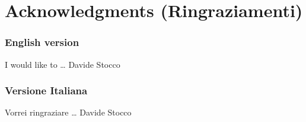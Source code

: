
\chapter*{Acknowledgments (Ringraziamenti)}
\label{chap:acknowledgements}


\subsection*{English version}

I would like to \dots
\bigskip
\hfill{Davide Stocco}

\subsection*{Versione Italiana}

Vorrei ringraziare \dots
\bigskip
\hfill{Davide Stocco}

\vfill
